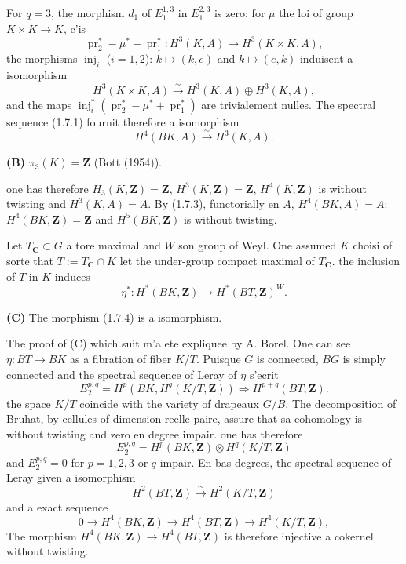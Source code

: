 \documentclass[11pt,a4paper]{article}
\theoremstyle{plain}
\theoremstyle{definition}
\DeclareMathOperator{\pr}{pr}
\DeclareMathOperator{\inj}{inj}
\begin{document}
For $q = 3$, the morphism $d_1$ of $E_1^{1,3}$ in $E_1^{2,3}$ is zero: for $\mu$ the loi of group $K \times K \to K$, c'is
\[
\pr_2^* - \mu^* + \pr_1^* : H^3(K, A) \to H^3(K \times K, A),
\]
the morphisms $\inj_i$ ($i = 1, 2$): $k \mapsto (k,e)$ and $k \mapsto (e,k)$ induisent a isomorphism
\[
H^3(K \times K, A) \xrightarrow{\sim} H^3(K, A) \oplus H^3(K, A),
\]
and the maps $\inj_i^*(\pr_2^* - \mu^* + \pr_1^*)$ are trivialement nulles. The spectral sequence (1.7.1) fournit therefore a isomorphism
\begin{equation}\label{1.7.3}
H^4(BK, A) \xrightarrow{\sim} H^3(K, A).
\end{equation}

\textbf{(B)} $\pi_3(K) = \mathbf{Z}$ (Bott (1954)).

one has therefore $H_3(K, \mathbf{Z}) = \mathbf{Z}$, $H^3(K, \mathbf{Z}) = \mathbf{Z}$, $H^4(K, \mathbf{Z})$ is without twisting and $H^3(K, A) = A$. By (1.7.3), functorially en $A$, $H^4(BK, A) = A$: $H^4(BK, \mathbf{Z}) = \mathbf{Z}$ and $H^5(BK, \mathbf{Z})$ is without twisting.

Let $T_\mathbf{C} \subset G$ a tore maximal and $W$ son group of Weyl. One assumed $K$ choisi of sorte that $T := T_\mathbf{C} \cap K$ let the under-group compact maximal of $T_\mathbf{C}$. the inclusion of $T$ in $K$ induces
\begin{equation}\label{1.7.4}
\eta^* : H^*(BK, \mathbf{Z}) \to H^*(BT, \mathbf{Z})^W.
\end{equation}

\textbf{(C)} The morphism (1.7.4) is a isomorphism.

The proof of (C) which suit m'a ete expliquee by A. Borel. One can see $\eta : BT \to BK$ as a fibration of fiber $K/T$. Puisque $G$ is connected, $BG$ is simply connected and the spectral sequence of Leray of $\eta$ s'ecrit
\[
E_2^{p,q} = H^p(BK, H^q(K/T, \mathbf{Z})) \Rightarrow H^{p+q}(BT, \mathbf{Z}).
\]
the space $K/T$ coincide with the variety of drapeaux $G/B$. The decomposition of Bruhat, by cellules of dimension reelle paire, assure that sa cohomology is without twisting and zero en degree impair. one has therefore
\[
E_2^{p,q} = H^p(BK, \mathbf{Z}) \otimes H^q(K/T, \mathbf{Z})
\]
and $E_2^{p,q} = 0$ for $p = 1, 2, 3$ or $q$ impair. En bas degrees, the spectral sequence of Leray given a isomorphism
\[
H^2(BT, \mathbf{Z}) \xrightarrow{\sim} H^2(K/T, \mathbf{Z})
\]
and a exact sequence
\[
0 \to H^4(BK, \mathbf{Z}) \to H^4(BT, \mathbf{Z}) \to H^4(K/T, \mathbf{Z}),
\]
The morphism $H^4(BK, \mathbf{Z}) \to H^4(BT, \mathbf{Z})$ is therefore injective a cokernel without twisting.
\end{document}

